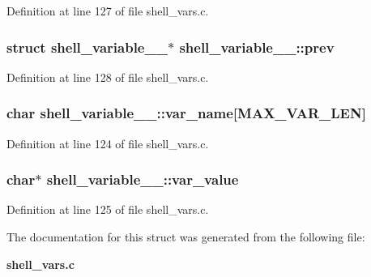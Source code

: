 Definition at line 127 of file shell\_\-vars.c.
\subsubsection[{prev}]{\setlength{\rightskip}{0pt plus 5cm}struct {\bf shell\_\-variable\_\-\_\-}$\ast$ {\bf shell\_\-variable\_\-\_\-::prev}\hspace{0.3cm}{\tt  [read]}}\label{structshell__variable_____9879e881df74561b574d56c45814d3f3}




Definition at line 128 of file shell\_\-vars.c.
\subsubsection[{var\_\-name}]{\setlength{\rightskip}{0pt plus 5cm}char {\bf shell\_\-variable\_\-\_\-::var\_\-name}[MAX\_\-VAR\_\-LEN]}\label{structshell__variable_____4762c0a19f41db96e04d416d1cb58c21}




Definition at line 124 of file shell\_\-vars.c.
\subsubsection[{var\_\-value}]{\setlength{\rightskip}{0pt plus 5cm}char$\ast$ {\bf shell\_\-variable\_\-\_\-::var\_\-value}}\label{structshell__variable_____529321e06f79480c4b0c485ef71442da}




Definition at line 125 of file shell\_\-vars.c.

The documentation for this struct was generated from the following file:\begin{CompactItemize}
\item 
{\bf shell\_\-vars.c}\end{CompactItemize}
